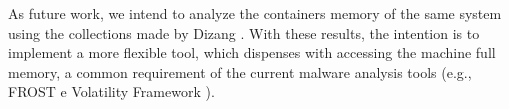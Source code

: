 \documentclass[conference]{IEEEtran}
\newcommand{\marcosR}[1]{{\color{brown}{COMMENT: #1}}}
\newcommand{\fancyname}{Dizang }
\begin{document}
As future work, we intend to analyze the containers memory of the same system using the collections made by \fancyname. 
%
With these results, the intention is to implement a more flexible tool, which dispenses with accessing the machine full memory, a common requirement of the current malware analysis tools (e.g., FROST \cite{Dykstra_FROST:2013} e Volatility Framework \cite{VolatilityFoundation2014}).



%
%
%






\end{document}
